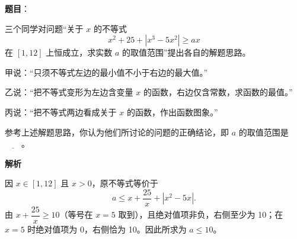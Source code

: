 \begin{answer}

\textbf{题目}：

三个同学对问题“关于 $x$ 的不等式
\nopagebreak[4]
\[
x^2+25+|x^3-5x^2|\ge ax
\]
在 $[1,12]$ 上恒成立，求实数 $a$ 的取值范围”提出各自的解题思路。

甲说：“只须不等式左边的最小值不小于右边的最大值。”

乙说：“把不等式变形为左边含变量 $x$ 的函数，右边仅含常数，求函数的最值。”

丙说：“把不等式两边看成关于 $x$ 的函数，作出函数图象。”

参考上述解题思路，你认为他们所讨论的问题的正确结论，即 $a$ 的取值范围是 $\underline{\qquad}$。

\textbf{解析}

因 $x\in[1,12]$ 且 $x>0$，原不等式等价于
\nopagebreak[4]
\[
a\le x+\frac{25}{x}+|x^2-5x|.
\]
由 $x+\dfrac{25}{x}\ge10$（等号在 $x=5$ 取到），且绝对值项非负，右侧至少为 10；在 $x=5$ 时绝对值项为 0，右侧恰为 10。因此所求为 $a\le10$。


\end{answer}

